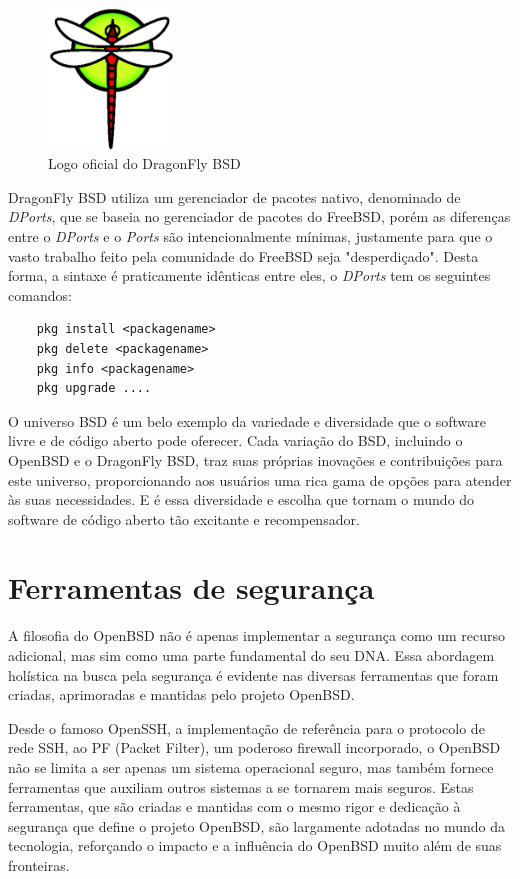 \documentclass[a4paper,10pt]{article}
\begin{document}
\begin{figure}[!ht]
    \centering
    \includegraphics[width=0.3\textwidth]{imagens/logo-dragonflybsd.png}
    \caption{Logo oficial do DragonFly BSD}
\end{figure}


DragonFly BSD utiliza um gerenciador de pacotes nativo, denominado de \textit{DPorts}, que se baseia no gerenciador de pacotes do FreeBSD, porém as diferenças entre o \textit{DPorts} e o \textit{Ports} são intencionalmente mínimas, justamente para que o vasto trabalho feito pela comunidade do FreeBSD seja "desperdiçado". Desta forma, a sintaxe é praticamente idênticas entre eles, o \textit{DPorts} tem os seguintes comandos:

\begin{lstlisting}
    pkg install <packagename>
    pkg delete <packagename>
    pkg info <packagename>
    pkg upgrade ....
\end{lstlisting}

O universo BSD é um belo exemplo da variedade e diversidade que o software livre e de código aberto pode oferecer. Cada variação do BSD, incluindo o OpenBSD e o DragonFly BSD, traz suas próprias inovações e contribuições para este universo, proporcionando aos usuários uma rica gama de opções para atender às suas necessidades. E é essa diversidade e escolha que tornam o mundo do software de código aberto tão excitante e recompensador.

\section{Ferramentas de segurança}
A filosofia do OpenBSD não é apenas implementar a segurança como um recurso adicional, mas sim como uma parte fundamental do seu DNA. Essa abordagem holística na busca pela segurança é evidente nas diversas ferramentas que foram criadas, aprimoradas e mantidas pelo projeto OpenBSD.

Desde o famoso OpenSSH, a implementação de referência para o protocolo de rede SSH, ao PF (Packet Filter), um poderoso firewall incorporado, o OpenBSD não se limita a ser apenas um sistema operacional seguro, mas também fornece ferramentas que auxiliam outros sistemas a se tornarem mais seguros. Estas ferramentas, que são criadas e mantidas com o mesmo rigor e dedicação à segurança que define o projeto OpenBSD, são largamente adotadas no mundo da tecnologia, reforçando o impacto e a influência do OpenBSD muito além de suas fronteiras.
\end{document}
